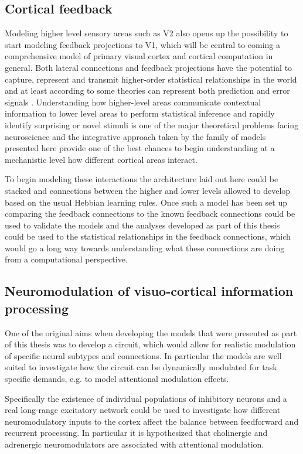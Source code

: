 \subsection{Cortical feedback}

Modeling higher level sensory areas such as V2 also opens up the
possibility to start modeling feedback projections to V1, which will
be central to coming a comprehensive model of primary visual cortex
and cortical computation in general. Both lateral connections and
feedback projections have the potential to capture, represent and
transmit higher-order statistical relationships in the world and at
least according to some theories can represent both prediction and
error signals \citep{Rao1999, Spratling2011}. Understanding how
higher-level areas communicate contextual information to lower level
areas to perform statistical inference and rapidly identify surprising
or novel stimuli is one of the major theoretical problems facing
neuroscience and the integrative approach taken by the family of
models presented here provide one of the best chances to begin
understanding at a mechanistic level how different cortical areas
interact.

To begin modeling these interactions the architecture laid out here
could be stacked and connections between the higher and lower levels
allowed to develop based on the usual Hebbian learning rules. Once
such a model has been set up comparing the feedback connections to the
known feedback connections could be used to validate the models and
the analyses developed as part of this thesis could be used to the
statistical relationships in the feedback connections, which would go
a long way towards understanding what these connections are doing from
a computational perspective.

\subsection{Neuromodulation of visuo-cortical information processing}

One of the original aims when developing the models that were
presented as part of this thesis was to develop a circuit, which would
allow for realistic modulation of specific neural subtypes and
connections. In particular the models are well suited to investigate
how the circuit can be dynamically modulated for task specific
demands, e.g. to model attentional modulation effects.

Specifically the existence of individual populations of inhibitory
neurons and a real long-range excitatory network could be used to
investigate how different neuromodulatory inputs to the cortex affect
the balance between feedforward and recurrent processing. In
particular it is hypothesized that cholinergic and adrenergic
neuromodulators are associated with attentional modulation.

